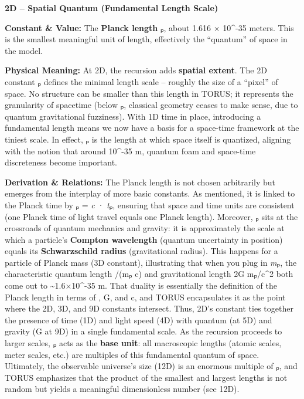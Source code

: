 \documentclass[
]{article}
\begin{document}
{\textbf{2D -- Spatial Quantum (Fundamental Length Scale)}

\textbf{Constant \& Value:} The \textbf{Planck length} \emph{\ell}ₚ, about
1.616 × 10\^{}-35 meters\hspace{0pt}. This is the smallest meaningful
unit of length, effectively the ``quantum'' of space in the model.

\textbf{Physical Meaning:} At 2D, the recursion adds \textbf{spatial
extent}. The 2D constant \emph{\ell}ₚ defines the minimal length scale --
roughly the size of a ``pixel'' of space. No structure can be smaller
than this length in TORUS; it represents the granularity of spacetime
(below \emph{\ell}ₚ, classical geometry ceases to make sense, due to
quantum gravitational fuzziness). With 1D time in place, introducing a
fundamental length means we now have a basis for a space-time framework
at the tiniest scale. In effect, \emph{\ell}ₚ is the length at which space
itself is quantized, aligning with the notion that around 10\^{}-35 m,
quantum foam and space-time discreteness become important.

\textbf{Derivation \& Relations:} The Planck length is not chosen
arbitrarily but emerges from the interplay of more basic constants. As
mentioned, it is linked to the Planck time by \emph{\ell}ₚ = \emph{c} ·
\emph{t}ₚ, ensuring that space and time units are consistent (one Planck
time of light travel equals one Planck length). Moreover, \emph{\ell}ₚ sits
at the crossroads of quantum mechanics and gravity: it is approximately
the scale at which a particle's \textbf{Compton wavelength} (quantum
uncertainty in position) equals its \textbf{Schwarzschild radius}
(gravitational radius). This happens for a particle of Planck mass (3D
constant), illustrating that when you plug in \emph{m}ₚ, the
characteristic quantum length \hbar/(mₚ c) and gravitational length 2G
mₚ/c\^{}2 both come out to \textasciitilde1.6×10\^{}-35 m\hspace{0pt}.
That duality is essentially the definition of the Planck length in terms
of \hbar, G, and c, and TORUS encapsulates it as the point where the 2D, 3D,
and 9D constants intersect. Thus, 2D's constant ties together the
presence of time (1D) and light speed (4D) with quantum (\hbar at 5D) and
gravity (G at 9D) in a single fundamental scale\hspace{0pt}. As the
recursion proceeds to larger scales, \emph{\ell}ₚ acts as the \textbf{base
unit}: all macroscopic lengths (atomic scales, meter scales, etc.) are
multiples of this fundamental quantum of space. Ultimately, the
observable universe's size (12D) is an enormous multiple of \emph{\ell}ₚ,
and TORUS emphasizes that the product of the smallest and largest
lengths is not random but yields a meaningful dimensionless number (see
12D)\hspace{0pt}.

}
\end{document}
